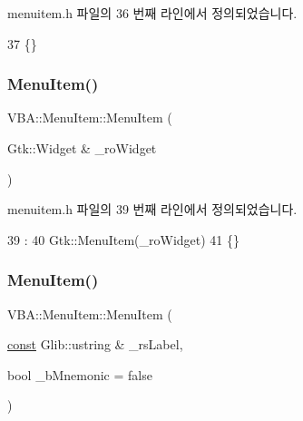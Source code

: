 menuitem.\+h 파일의 36 번째 라인에서 정의되었습니다.


\begin{DoxyCode}
37     \{\}
\end{DoxyCode}
\mbox{\label{class_v_b_a_1_1_menu_item_a4fd75eb019ae756ae60bc0699bf8b101}} 
\subsubsection{\texorpdfstring{Menu\+Item()}{MenuItem()}\hspace{0.1cm}{\footnotesize\ttfamily [2/3]}}
{\footnotesize\ttfamily V\+B\+A\+::\+Menu\+Item\+::\+Menu\+Item (\begin{DoxyParamCaption}\item[{Gtk\+::\+Widget \&}]{\+\_\+ro\+Widget }\end{DoxyParamCaption})\hspace{0.3cm}{\ttfamily [inline]}}



menuitem.\+h 파일의 39 번째 라인에서 정의되었습니다.


\begin{DoxyCode}
39                                   :
40     Gtk::MenuItem(\_roWidget)
41     \{\}
\end{DoxyCode}
\mbox{\label{class_v_b_a_1_1_menu_item_afa20a05e88460b0b601c4cd2a4217298}} 
\subsubsection{\texorpdfstring{Menu\+Item()}{MenuItem()}\hspace{0.1cm}{\footnotesize\ttfamily [3/3]}}
{\footnotesize\ttfamily V\+B\+A\+::\+Menu\+Item\+::\+Menu\+Item (\begin{DoxyParamCaption}\item[{\mbox{\hyperlink{getopt1_8c_a2c212835823e3c54a8ab6d95c652660e}{const}} Glib\+::ustring \&}]{\+\_\+rs\+Label,  }\item[{bool}]{\+\_\+b\+Mnemonic = {\ttfamily false} }\end{DoxyParamCaption})\hspace{0.3cm}{\ttfamily [inline]}}



